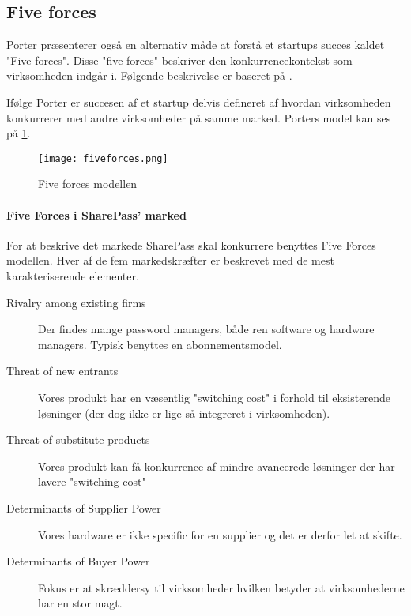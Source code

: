 \subsection{Five forces}
 Porter præsenterer også en alternativ måde at forstå et startups succes kaldet "Five forces".
 Disse "five forces" beskriver den konkurrencekontekst som virksomheden indgår i.
 Følgende beskrivelse er baseret på \citet[p.~16]{rose2012software}.

 Ifølge Porter er succesen af et startup delvis defineret af hvordan virksomheden konkurrerer med andre virksomheder på samme marked.
 Porters model kan ses på \cref{fiveforces}.

\begin{figure}
	\texttt{[image: fiveforces.png]}
	\caption{Five forces modellen}
	\label{fiveforces}
\end{figure}

\paragraph{Five Forces i SharePass' marked} %
\label{par:five_forces_i_sharepass_marked}

For at beskrive det markede SharePass skal konkurrere benyttes Five Forces modellen. 
Hver af de fem markedskræfter er beskrevet med de mest karakteriserende elementer.

\begin{description}
	\item[Rivalry among existing firms] Der findes mange password managers, både ren software og hardware managers. Typisk benyttes en abonnementsmodel.
	\item[Threat of new entrants] Vores produkt har en væsentlig "switching cost" i forhold til eksisterende løsninger (der dog ikke er lige så integreret i virksomheden). 
	\item [Threat of substitute products] Vores produkt kan få konkurrence af mindre avancerede løsninger der har lavere "switching cost"
	\item [Determinants of Supplier Power] Vores hardware er ikke specific for en supplier og det er derfor let at skifte. 
	\item [Determinants of Buyer Power] Fokus er at skræddersy til virksomheder hvilken betyder at virksomhederne har en stor magt.
\end{description}
